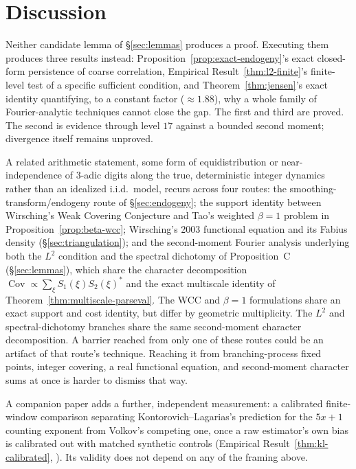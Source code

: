 \documentclass[11pt]{article}
\theoremstyle{definition}
\theoremstyle{remark}
\DeclareMathOperator{\Cov}{Cov}
\begin{document}
\section{Discussion}
\label{sec:discussion}

Neither candidate lemma of \S\ref{sec:lemmas} produces a proof.
Executing them produces three results instead:
Proposition~\ref{prop:exact-endogeny}'s exact closed-form persistence
of coarse correlation, Empirical Result~\ref{thm:l2-finite}'s
finite-level test of a specific sufficient condition, and
Theorem~\ref{thm:jensen}'s exact identity quantifying, to a constant
factor ($\approx1.88$), why a whole family of Fourier-analytic
techniques cannot close the gap. The first and third are proved. The
second is evidence through level $17$ against a bounded second moment;
divergence itself remains unproved.

A related arithmetic statement, some form of equidistribution or
near-independence of $3$-adic digits along the true, deterministic
integer dynamics rather than an idealized i.i.d.\ model, recurs across
four routes: the smoothing-transform/endogeny route of
\S\ref{sec:endogeny}; the support identity between Wirsching's Weak
Covering Conjecture and Tao's weighted $\beta=1$ problem in
Proposition~\ref{prop:beta-wcc}; Wirsching's 2003 functional equation
and its Fabius density (\S\ref{sec:triangulation}); and the
second-moment Fourier analysis underlying both the $L^2$ condition and
the spectral dichotomy of Proposition~C (\S\ref{sec:lemmas}), which
share the character decomposition
$\Cov\propto\sum_\xi S_1(\xi)S_2(\xi)^\ast$ and the exact multiscale
identity of Theorem~\ref{thm:multiscale-parseval}. The WCC and
$\beta=1$ formulations share an exact support and cost identity, but
differ by geometric multiplicity. The $L^2$ and spectral-dichotomy
branches share the same second-moment character decomposition. A
barrier reached from only one of these routes could be an artifact of
that route's technique. Reaching it from branching-process fixed
points, integer covering, a real functional equation, and
second-moment character sums at once is harder to dismiss that way.

A companion paper adds a further, independent measurement: a
calibrated finite-window comparison separating Kontorovich--Lagarias's
prediction for the $5x+1$ counting exponent from Volkov's competing
one, once a raw estimator's own bias is calibrated out with matched
synthetic controls (Empirical Result~\ref{thm:kl-calibrated},
\cite{KLVolkovCompanion}). Its validity does not depend on any of the
framing above.
\end{document}
